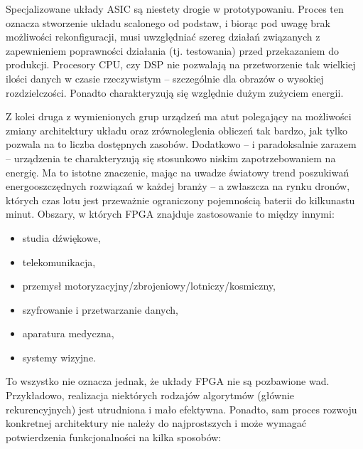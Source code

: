Specjalizowane układy ASIC są niestety drogie w prototypowaniu. 
Proces ten oznacza stworzenie układu scalonego od podstaw, i biorąc pod uwagę brak możliwości rekonfiguracji, musi uwzględniać szereg działań związanych z zapewnieniem poprawności działania (tj. testowania) przed przekazaniem do produkcji. 
Procesory CPU, czy DSP nie pozwalają na przetworzenie tak wielkiej ilości danych w czasie rzeczywistym -- szczególnie dla obrazów o wysokiej rozdzielczości. Ponadto charakteryzują się względnie dużym zużyciem energii.

Z kolei druga z wymienionych grup urządzeń ma atut polegający na możliwości zmiany architektury układu oraz zrównoleglenia obliczeń tak bardzo, jak tylko pozwala na to liczba dostępnych zasobów.
Dodatkowo -- i paradoksalnie zarazem -- urządzenia te charakteryzują się stosunkowo niskim zapotrzebowaniem na energię. 
Ma to istotne znaczenie, mając na uwadze światowy trend poszukiwań energooszczędnych rozwiązań w każdej branży --  a zwłaszcza na rynku dronów, których czas lotu jest przeważnie ograniczony pojemnością baterii do kilkunastu minut.
Obszary, w których FPGA znajduje zastosowanie to między innymi:
\begin{itemize}
	\item studia dźwiękowe,
	\item telekomunikacja,
	\item przemysł motoryzacyjny/zbrojeniowy/lotniczy/kosmiczny,
	\item szyfrowanie i przetwarzanie danych,
	\item aparatura medyczna,
	\item systemy wizyjne.
\end{itemize}
To wszystko nie oznacza jednak, że układy FPGA nie są pozbawione wad. 
Przykładowo, realizacja niektórych rodzajów algorytmów (głównie rekurencyjnych) jest utrudniona i mało efektywna. 
Ponadto, sam proces rozwoju konkretnej architektury nie należy do najprostszych i może wymagać potwierdzenia funkcjonalności na kilka sposobów:

